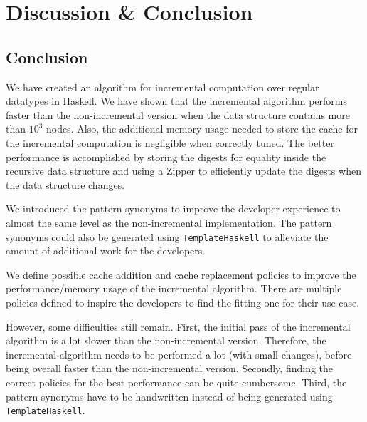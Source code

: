 \chapter{Discussion \& Conclusion}





\section{Conclusion}

We have created an algorithm for incremental computation over regular datatypes in Haskell. We have shown that the incremental algorithm performs faster than the non-incremental version when the data structure contains more than $10^3$ nodes. Also, the additional memory usage needed to store the cache for the incremental computation is negligible when correctly tuned. The better performance is accomplished by storing the digests for equality inside the recursive data structure and using a Zipper to efficiently update the digests when the data structure changes.

We introduced the pattern synonyms to improve the developer experience to almost the same level as the non-incremental implementation. The pattern synonyms could also be generated using \texttt{TemplateHaskell} to alleviate the amount of additional work for the developers.

We define possible cache addition and cache replacement policies to improve the performance/memory usage of the incremental algorithm. There are multiple policies defined to inspire the developers to find the fitting one for their use-case.

However, some difficulties still remain. First, the initial pass of the incremental algorithm is a lot slower than the non-incremental version. Therefore, the incremental algorithm needs to be performed a lot (with small changes), before being overall faster than the non-incremental version. Secondly, finding the correct policies for the best performance can be quite cumbersome. Third, the pattern synonyms have to be handwritten instead of being generated using \texttt{TemplateHaskell}.
